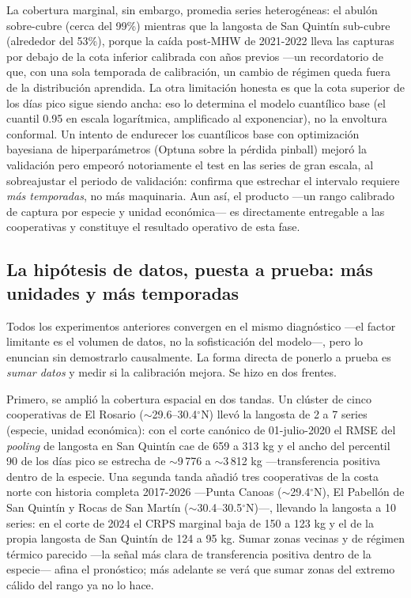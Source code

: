 \documentclass[twoside,11pt]{article}
\begin{document}
La cobertura marginal, sin embargo, promedia series heterogéneas: el abulón sobre-cubre (cerca del 99\%) mientras que la langosta de San Quintín sub-cubre (alrededor del 53\%), porque la caída post-MHW de 2021-2022 lleva las capturas por debajo de la cota inferior calibrada con años previos ---un recordatorio de que, con una sola temporada de calibración, un cambio de régimen queda fuera de la distribución aprendida. La otra limitación honesta es que la cota superior de los días pico sigue siendo ancha: eso lo determina el modelo cuantílico base (el cuantil 0.95 en escala logarítmica, amplificado al exponenciar), no la envoltura conformal. Un intento de endurecer los cuantílicos base con optimización bayesiana de hiperparámetros (Optuna sobre la pérdida pinball) mejoró la validación pero empeoró notoriamente el test en las series de gran escala, al sobreajustar el periodo de validación: confirma que estrechar el intervalo requiere \emph{más temporadas}, no más maquinaria. Aun así, el producto ---un rango calibrado de captura por especie y unidad económica--- es directamente entregable a las cooperativas y constituye el resultado operativo de esta fase.

\subsection{La hipótesis de datos, puesta a prueba: más unidades y más temporadas}
\label{sec:extension_moredata}
Todos los experimentos anteriores convergen en el mismo diagnóstico ---el factor limitante es el volumen de datos, no la sofisticación del modelo---, pero lo enuncian sin demostrarlo causalmente. La forma directa de ponerlo a prueba es \emph{sumar datos} y medir si la calibración mejora. Se hizo en dos frentes.

Primero, se amplió la cobertura espacial en dos tandas. Un clúster de cinco cooperativas de El Rosario ($\sim$29.6--30.4$^\circ$N) llevó la langosta de 2 a 7 series (especie, unidad económica): con el corte canónico de 01-julio-2020 el RMSE del \emph{pooling} de langosta en San Quintín cae de 659 a 313 kg y el ancho del percentil 90 de los días pico se estrecha de $\sim$9\,776 a $\sim$3\,812 kg ---transferencia positiva dentro de la especie. Una segunda tanda añadió tres cooperativas de la costa norte con historia completa 2017-2026 ---Punta Canoas ($\sim$29.4$^\circ$N), El Pabellón de San Quintín y Rocas de San Martín ($\sim$30.4--30.5$^\circ$N)---, llevando la langosta a 10 series: en el corte de 2024 el CRPS marginal baja de 150 a 123 kg y el de la propia langosta de San Quintín de 124 a 95 kg. Sumar zonas vecinas y de régimen térmico parecido ---la señal más clara de transferencia positiva dentro de la especie--- afina el pronóstico; más adelante se verá que sumar zonas del extremo cálido del rango ya no lo hace.
\end{document}
